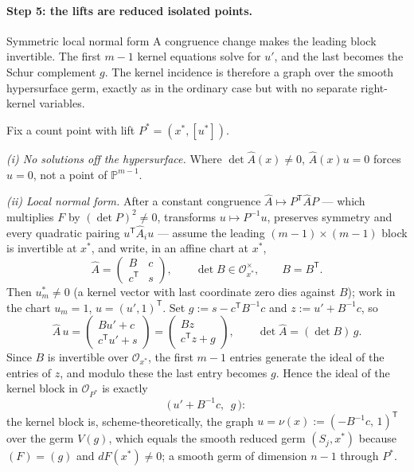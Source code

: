 \documentclass[acmsmall,screen,nonacm]{acmart}
\theoremstyle{definition}
\theoremstyle{remark}
\newcommand{\PP}{\mathbb{P}}
\newcommand{\OO}{\mathcal{O}}
\begin{document}
\paragraph{Step 5: the lifts are reduced isolated points.}
\begin{detailbox}{Symmetric local normal form}
A congruence change makes the leading block invertible.  The first $m-1$
kernel equations solve for $u'$, and the last becomes the Schur complement
$g$.  The kernel incidence is therefore a graph over the smooth hypersurface
germ, exactly as in the ordinary case but with no separate right-kernel
variables.
\end{detailbox}
Fix a count point with lift $P^*=(x^*,[u^*])$.

\emph{(i) No solutions off the hypersurface.}  Where
$\det\widehat A(x)\ne0$, $\widehat A(x)u=0$ forces $u=0$, not a point
of $\PP^{m-1}$.

\emph{(ii) Local normal form.}  After a constant congruence
$\widehat A\mapsto P^{\mathsf T}\widehat AP$ --- which multiplies $F$
by $(\det P)^2\ne0$, transforms $u\mapsto P^{-1}u$, preserves symmetry
and every quadratic pairing
$u^{\mathsf T}\widehat A_iu$ --- assume the leading
$(m-1)\times(m-1)$ block is invertible at $x^*$, and write, in an
affine chart at $x^*$,
\[
  \widehat A=\begin{pmatrix}B&c\\ c^{\mathsf T}&s\end{pmatrix},
  \qquad \det B\in\OO_{x^*}^{\times},
  \qquad B=B^{\mathsf T}.
\]
Then $u^*_m\ne0$ (a kernel vector with last coordinate zero dies
against $B$); work in the chart $u_m=1$, $u=(u',1)^{\mathsf T}$.  Set
$g:=s-c^{\mathsf T}B^{-1}c$ and $z:=u'+B^{-1}c$, so
\[
  \widehat A\,u
  =\begin{pmatrix}Bu'+c\\ c^{\mathsf T}u'+s\end{pmatrix}
  =\begin{pmatrix}Bz\\ c^{\mathsf T}z+g\end{pmatrix},
  \qquad
  \det\widehat A=(\det B)\,g .
\]
Since $B$ is invertible over $\OO_{x^*}$, the first $m-1$ entries
generate the ideal of the entries of $z$, and modulo these the last
entry becomes $g$.  Hence the ideal of the kernel block in
$\OO_{P^*}$ is exactly
\[
  \big(\,u'+B^{-1}c,\ \ g\,\big):
\]
the kernel block is, scheme-theoretically, the graph
$u=\nu(x):=(-B^{-1}c,\,1)^{\mathsf T}$ over the germ $V(g)$, which
equals the smooth reduced germ $(S_j,x^*)$ because $(F)=(g)$ and
$dF(x^*)\ne0$; a smooth germ of dimension $n-1$ through $P^*$.
\end{document}
